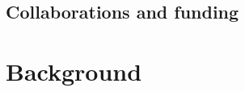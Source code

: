 \section{Collaborations and funding}


\pagebreak
\chapter{Background}\label{chap:background}\label{sec2}


